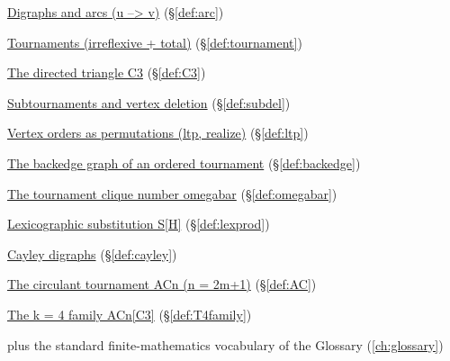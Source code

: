 \begin{closurepanel}
\item \hyperref[def:arc]{Digraphs and arcs (u --> v)} (\S\ref*{def:arc})
\item \hyperref[def:tournament]{Tournaments (irreflexive + total)} (\S\ref*{def:tournament})
\item \hyperref[def:C3]{The directed triangle C3} (\S\ref*{def:C3})
\item \hyperref[def:subdel]{Subtournaments and vertex deletion} (\S\ref*{def:subdel})
\item \hyperref[def:ltp]{Vertex orders as permutations (ltp, realize)} (\S\ref*{def:ltp})
\item \hyperref[def:backedge]{The backedge graph of an ordered tournament} (\S\ref*{def:backedge})
\item \hyperref[def:omegabar]{The tournament clique number omegabar} (\S\ref*{def:omegabar})
\item \hyperref[def:lexprod]{Lexicographic substitution S[H]} (\S\ref*{def:lexprod})
\item \hyperref[def:cayley]{Cayley digraphs} (\S\ref*{def:cayley})
\item \hyperref[def:AC]{The circulant tournament ACn (n = 2m+1)} (\S\ref*{def:AC})
\item \hyperref[def:T4family]{The k = 4 family ACn[C3]} (\S\ref*{def:T4family})
\item plus the standard finite-mathematics vocabulary of the Glossary (\cref{ch:glossary})
\end{closurepanel}
